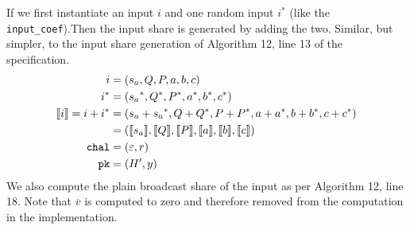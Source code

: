 \documentclass[11pt]{report}
\theoremstyle{definition}
\theoremstyle{plain}
\begin{document}
If we first instantiate an input $i$ and one random input $i^*$ (like the \texttt{input\_coef}).Then the input share is generated by adding the two. Similar, but simpler, to the input share generation of Algorithm 12, line 13 of the specification.
\begin{align*}
  i                & = (s_a, Q, P, a,b,c)                                             \\
  i^*              & = ({s_a}^*, Q^*, P^*, a^*,b^*,c^*)                               \\
  \llbracket i \rrbracket = i + i^* & = ({s_a} + {s_a}^*, Q + Q^*, P + P^*, a + a^*, b + b^*, c + c^*) \\
                   & = (\llbracket s_a \rrbracket, \llbracket Q \rrbracket, \llbracket P \rrbracket, \llbracket a \rrbracket, \llbracket b \rrbracket, \llbracket c \rrbracket)             \\
  \texttt{chal}    & = (\varepsilon, r)                                               \\
  \texttt{pk}      & = (H', y)
\end{align*}
We also compute the plain broadcast share of the input as per Algorithm 12, line 18. Note that $\overline{v}$ is computed to zero and therefore removed from the computation in the implementation.
\end{document}
